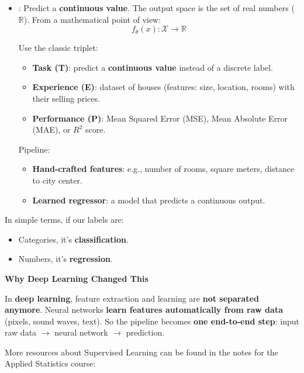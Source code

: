 \begin{itemize}
    \item {}: Predict a \textbf{continuous value}. The output space is the set of real numbers ($\mathbb{R}$). From a mathematical point of view:
    \begin{equation*}
        f_\theta(x) : \mathcal{X} \to \mathbb{R}
    \end{equation*}
    \begin{examplebox}
        Use the classic triplet:
        \begin{itemize}
            \item \textbf{Task (T)}: predict a \textbf{continuous value} instead of a discrete label.
            \item \textbf{Experience (E)}: dataset of houses (features: size, location, rooms) with their selling prices.
            \item \textbf{Performance (P)}: Mean Squared Error (MSE), Mean Absolute Error (MAE), or $R^{2}$ score.
        \end{itemize}
        Pipeline:
        \begin{itemize}
            \item \textbf{Hand-crafted features}: e.g., number of rooms, square meters, distance to city center.
            \item \textbf{Learned regressor}: a model that predicts a continuous output.
        \end{itemize}
    \end{examplebox}
\end{itemize}
In simple terms, if our labels are:
\begin{itemize}
    \item Categories, it's \textbf{classification}.
    \item Numbers, it's \textbf{regression}.
\end{itemize}

\highspace
\begin{flushleft}
    \textcolor{Green3}{ \textbf{Why Deep Learning Changed This}}
\end{flushleft}
In \textbf{deep learning}, feature extraction and learning are \textbf{not separated anymore}. Neural networks \textbf{learn features automatically from raw data} (pixels, sound waves, text). So the pipeline becomes \textbf{one end-to-end step}: input raw data $\to$ neural network $\to$ prediction.

\highspace
More resources about Supervised Learning can be found in the notes for the Applied Statistics course:
\begin{center}
\end{center}